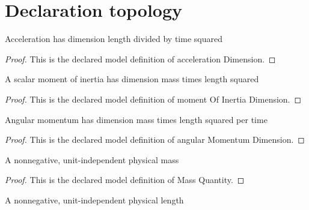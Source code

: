 \section{Declaration topology}
\begin{definition}
  \label{def:physics:phyx-mini-0790:phyxminiproblems-problemphyxmini0790-accelerationdimension}
  Acceleration has dimension length divided by time squared
\end{definition}
\begin{proof}
  This is the declared model definition of acceleration Dimension.
\end{proof}
\begin{definition}
  \label{def:physics:phyx-mini-0790:phyxminiproblems-problemphyxmini0790-momentofinertiadimension}
  A scalar moment of inertia has dimension mass times length squared
\end{definition}
\begin{proof}
  This is the declared model definition of moment Of Inertia Dimension.
\end{proof}
\begin{definition}
  \label{def:physics:phyx-mini-0790:phyxminiproblems-problemphyxmini0790-angularmomentumdimension}
  Angular momentum has dimension mass times length squared per time
\end{definition}
\begin{proof}
  This is the declared model definition of angular Momentum Dimension.
\end{proof}
\begin{definition}
  \label{def:physics:phyx-mini-0790:phyxminiproblems-problemphyxmini0790-massquantity}
  A nonnegative, unit-independent physical mass
\end{definition}
\begin{proof}
  This is the declared model definition of Mass Quantity.
\end{proof}
\begin{definition}
  \label{def:physics:phyx-mini-0790:phyxminiproblems-problemphyxmini0790-lengthquantity}
  A nonnegative, unit-independent physical length
\end{definition}
